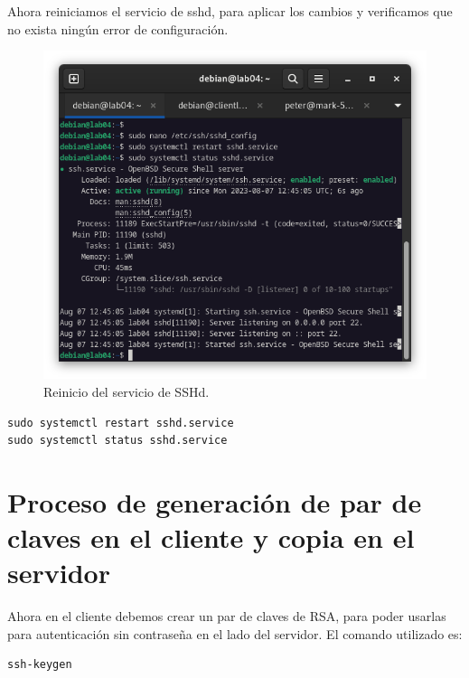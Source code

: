 Ahora reiniciamos el servicio de sshd, para aplicar los cambios y verificamos que no exista ningún error de configuración.

\begin{figure}[H]
	\centering
	\includegraphics[scale=0.40]{05}
	\caption{Reinicio del servicio de SSHd.}
\end{figure}

\begin{lstlisting}[style=mybash]
sudo systemctl restart sshd.service
sudo systemctl status sshd.service
\end{lstlisting}

\newpage
\section{Proceso de generación de par de claves en el cliente y copia en el servidor}

Ahora en el cliente debemos crear un par de claves de RSA, para poder usarlas para autenticación sin contraseña en el lado del servidor. El comando utilizado es:

\begin{lstlisting}[style=mybash]
ssh-keygen
\end{lstlisting}

